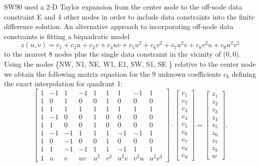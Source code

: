 \documentclass[12pt,letterpaper,margin=0.5in]{article}
\begin{document}
SW90 used a 2-D Taylor expansion from the center node to the off-node data constraint E
and 4 other nodes in order to include data constraints into the finite difference solution.
An alternative approach to incorporating off-node data constraints is fitting a biquadratic model
\begin{equation}
	z(u,v) = c_1 + c_2 u + c_3 v + c_4 u v + c_5 u^2 + c_6 v^2 + c_7 u^2v + c_8 v^2 u + c_9 u^2v^2
	\label{eq:biquadratic}
\end{equation}
to the nearest 8 nodes plus the single data constraint in the vicinity of ($0,0$).  Using the nodes 
\{NW, N1, NE, W1, E1, SW, S1, SE \} relative to the center node we obtain the following matrix equation
for the 9 unknown coefficients $c_k$ defining the exact interpolation for quadrant 1:
\begin{equation}
\left[ {\begin{array}{*{20}{c}}
1&{ - 1}&1&{ - 1}&1&1&1&{ - 1}&1\\
1&0&1&0&0&1&0&0&0\\
1&1&1&1&1&1&1&1&1\\
1&{ - 1}&0&0&1&0&0&0&0\\
1&1&0&0&1&0&0&0&0\\
1&{ - 1}&{ - 1}&1&1&1&{ - 1}&{ - 1}&1\\
1&0&{ - 1}&0&0&1&0&0&0\\
1&1&{ - 1}&{ - 1}&1&1&{ - 1}&1&1\\
1&u&v&{uv}&{{u^2}}&{{v^2}}&{{u^2}v}&{{v^2}u}&{{u^2}{v^2}}
\end{array}} \right] \cdot \left[ {\begin{array}{*{20}{c}}
{{c_1}}\\
{{c_2}}\\
{{c_3}}\\
{{c_4}}\\
{{c_5}}\\
{{c_6}}\\
{{c_7}}\\
{{c_8}}\\
{{c_9}}
\end{array}} \right] = \left[ {\begin{array}{*{20}{c}}
{{z_1}}\\
{{z_2}}\\
{{z_3}}\\
{{z_4}}\\
{{z_5}}\\
{{z_6}}\\
{{z_7}}\\
{{z_8}}\\
w
\end{array}} \right].
\end{equation}
\end{document}
